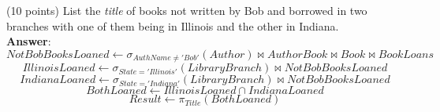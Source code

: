 \begin{questions}
\begin{choices}
	
	\choice(10 points) List the \textit{title} of books not written by Bob and borrowed in two branches with one of them being in Illinois and the other in Indiana. \\
    \textbf{Answer}:\\
    $$NotBobBooksLoaned \leftarrow \sigma_{AuthName \neq 'Bob'}(Author) \bowtie AuthorBook \bowtie Book \bowtie BookLoans$$
	$$IllinoisLoaned \leftarrow \sigma_{State='Illinois'}(LibraryBranch) \bowtie NotBobBooksLoaned$$
	$$IndianaLoaned \leftarrow \sigma_{State='Indiana'}(LibraryBranch) \bowtie NotBobBooksLoaned$$
	$$BothLoaned \leftarrow IllinoisLoaned \cap IndianaLoaned$$
	$$Result \leftarrow \pi_{Title}(BothLoaned)$$
	
\end{choices}

\end{questions}
